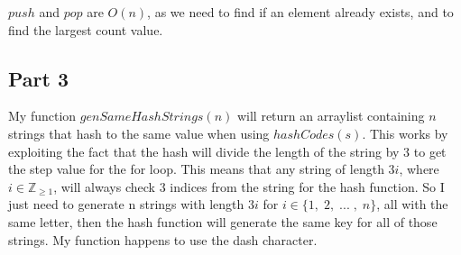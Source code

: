 \documentclass[11pt,a4paper,oneside, draft]{article}
\begin{document}
$push$ and $pop$ are $O(n)$, as we need to find if an element already
exists, and to find the largest count value.

\subsection*{Part 3}

My function $genSameHashStrings(n)$ will return an arraylist
containing $n$ strings that hash to the same value when using
$hashCodes(s)$. This works by exploiting the fact that the hash will
divide the length of the string by 3 to get the step value for the for
loop. This means that any string of length $3i$, where $i \in
\mathbb{Z}_{\ge 1}$, will always check $3$ indices from the string for
the hash function. So I just need to generate n strings with length
$3i$ for $i \in \{ 1,\; 2, \; ... \;, \; n\}$, all with the same letter, then the
hash function will generate the same key for all of those strings. My
function happens to use the dash character.
\end{document}
